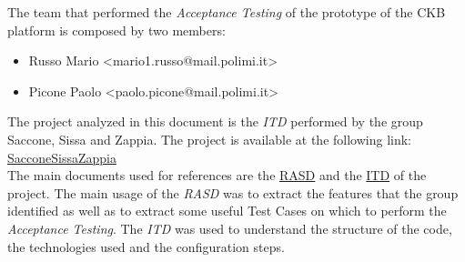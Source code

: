 \setcounter{page}{2}


\newpage

\clearpage
The team that performed the \textit{Acceptance Testing} of the prototype of the CKB platform is composed by two members:
\begin{itemize}
        \item Russo Mario <mario1.russo@mail.polimi.it>
        \item Picone Paolo <paolo.picone@mail.polimi.it>
\end{itemize}

The project analyzed in this document is the \textit{ITD} performed by the group Saccone, Sissa and Zappia. The project is available at the following link: \href{https://github.com/alessandrosaccone/SacconeSissaZappia}{SacconeSissaZappia} \\
The main documents used for references are the \href{https://github.com/alessandrosaccone/SacconeSissaZappia/blob/main/DeliveryFolder/RASDv1.pdf}{RASD} and the \href{https://github.com/alessandrosaccone/SacconeSissaZappia/blob/main/DeliveryFolder/ITDv1.pdf}{ITD} of the project. The main usage of the \textit{RASD} was to extract the features that the group identified as well as to extract some useful Test Cases on which to perform the \textit{Acceptance Testing}. The \textit{ITD} was used to understand the structure of the code, the technologies used and the configuration steps. \\

